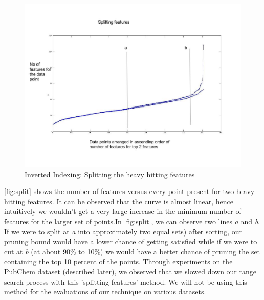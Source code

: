 \begin{figure}[ht]	
\centering
\includegraphics[width=1 \columnwidth]{img/feat_split.jpg}
\caption{Inverted Indexing: Splitting the heavy hitting features}
\label{fig:split}
\end{figure}

\autoref{fig:split} shows the number of features versus every point present for two heavy hitting features. It can be observed that the curve is almost linear, hence intuitively we wouldn't get a very large increase in the minimum number of features for the larger set of points.In \autoref{fig:split}, we can observe two lines \textit{a} and \textit{b}. If we were to split at \textit{a} into approximately two equal sets) after sorting, our pruning bound would have a lower chance of getting  satisfied while if we were to cut at \textit{b} (at about 90\% to 10\%) we would have a better chance of pruning the set containing the top 10 percent of the points. Through experiments on the PubChem dataset (described later), we observed that we slowed down our range search process with this 'splitting features' method. We will not be using this method for the evaluations of our technique on various datasets.